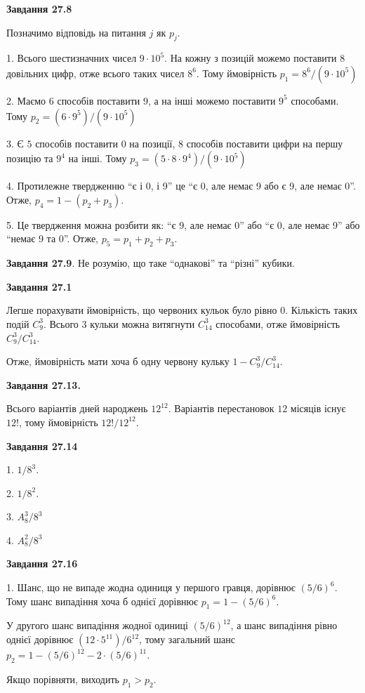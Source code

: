 \documentclass[12pt]{extarticle}
\begin{document}
\textbf{Завдання 27.8}

Позначимо відповідь на питання $j$ як $p_j$.

1. Всього шестизначних чисел $9 \cdot 10^5$. На кожну з позицій можемо поставити $8$ довільних цифр, отже всього таких чисел $8^6$. Тому ймовірність $p_1 = 8^6/(9 \cdot 10^5)$

2. Маємо $6$ способів поставити $9$, а на інші можемо поставити $9^5$ способами. Тому $p_2 = (6 \cdot 9^5) / (9 \cdot 10^5)$

3. Є $5$ способів поставити $0$ на позиції, $8$ способів поставити цифри на першу позицію та $9^4$ на інші. Тому $p_3=(5 \cdot 8 \cdot 9^4)/(9 \cdot 10^5)$

4. Протилежне твердженню ``є і 0, і 9'' це ``є 0, але немає 9 або є 9, але немає 0''. Отже, $p_4 = 1 - (p_2+p_3)$.

5. Це твердження можна розбити як: ``є 9, але немає 0'' або ``є 0, але немає 9'' або ``немає 9 та 0''. Отже, $p_5 = p_1 + p_2 + p_3$. 

\textbf{Завдання 27.9}. Не розумію, що таке ``однакові'' та ``різні'' кубики. 

\textbf{Завдання 27.1}

Легше порахувати ймовірність, що червоних кульок було рівно 0. Кількість таких подій $C_9^3$. Всього 3 кульки можна витягнути $C_{14}^3$ способами, отже ймовірність $C_9^3/C_{14}^3$. 

Отже, ймовірність мати хоча б одну червону кульку $1 - C_9^3/C_{14}^3$. 


\textbf{Завдання 27.13.}

Всього варіантів дней народжень $12^{12}$. Варіантів перестановок $12$ місяців існує $12!$, тому ймовірність $12!/12^{12}$.

\textbf{Завдання 27.14}

1. $1/8^3$. 

2. $1/8^2$.

3. $A_8^3 / 8^3$

4. $A_8^2 / 8^3$

\textbf{Завдання 27.16}

1. Шанс, що не випаде жодна одиниця у першого гравця, дорівнює $(5/6)^{6}$. Тому шанс випадіння хоча б однієї дорівнює $p_1=1-(5/6)^{6}$. 

У другого шанс випадіння жодної одиниці $(5/6)^{12}$, а шанс випадіння рівно однієї дорівнює $(12\cdot 5^{11})/6^{12}$, тому загальний шанс $p_2=1-(5/6)^{12}-2\cdot (5/6)^{11}$. 

Якщо порівняти, виходить $p_1>p_2$. 
\end{document}
